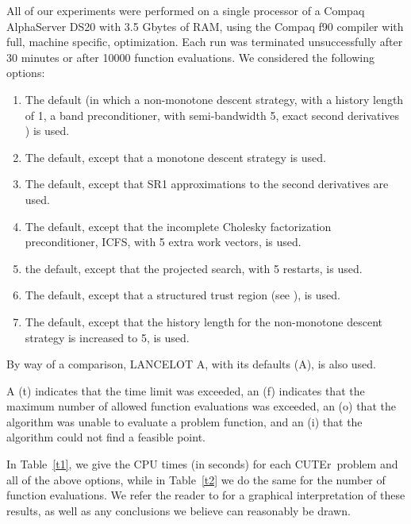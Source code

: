 \documentclass[11pt,twoside]{article}
\newcommand{\lana}{{\sf LANCELOT A}}
\newcommand{\cuter}{{\sf CUTEr}}
\begin{document}
\newpage


All of our experiments were performed
on a single processor of a Compaq AlphaServer DS20 with 3.5 Gbytes of RAM,
using the Compaq f90 compiler with full, machine specific, optimization.
Each run was terminated unsuccessfully after 30 minutes or after
10000 function evaluations. We considered
the following options:
\begin{enumerate}
\item The default (in which a non-monotone descent strategy, with a
history length of 1, a band preconditioner, with semi-bandwidth 5, exact second
derivatives ) is used.
\item The default, except that a monotone descent strategy is used.
\item The default, except that SR1 approximations to the second derivatives
are used.
\item The default, except that the  incomplete Cholesky
   factorization preconditioner, ICFS, with 5 extra work vectors, is used.
\item the default, except that the  projected search,
with 5 restarts, is used.
\item The default, except that a structured trust region
   (see ), is used.
\item The default, except that the history length for the
non-monotone descent strategy is increased to 5, is used.
\end{enumerate}
By way of a comparison, \lana, with its defaults (A), is also used.

A (t) indicates that the time limit was exceeded, an (f) indicates
that the maximum number of allowed function evaluations was exceeded,
an (o) that the algorithm was unable to evaluate a problem function, and an
(i) that the algorithm could not find a feasible point.

In Table~\ref{t1}, we give the CPU times (in seconds) for each
\cuter\ problem and all of the above options, while in
Table~\ref{t2} we do the same for the number of function evaluations.
We refer the reader to 
for a graphical interpretation of these results, as well as any
conclusions we believe can reasonably be drawn.
\end{document}
